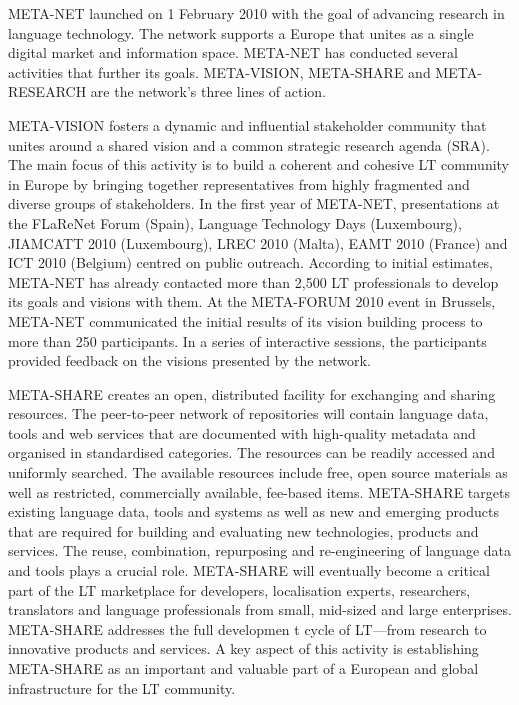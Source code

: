 \begin{multicols}{2}
META-NET launched on 1 February 2010 with the goal of advancing research in language technology. The network supports a Europe that unites as a single digital market and information space. META-NET has conducted several activities that further its goals. META-VISION, META-SHARE and META-RESEARCH are the network’s three lines of action.

META-VISION fosters a dynamic and influential stakeholder community that unites around a shared vision and a common strategic research agenda (SRA). The main focus of this activity is to build a coherent and cohesive LT community in Europe by bringing together representatives from highly fragmented and diverse groups of stakeholders. In the first year of META-NET, presentations at the FLaReNet Forum (Spain), Language Technology Days (Luxembourg), JIAMCATT 2010 (Luxembourg), LREC 2010 (Malta), EAMT 2010 (France) and ICT 2010 (Belgium) centred on public outreach. According to initial estimates, META-NET has already contacted more than 2,500 LT professionals to develop its goals and visions with them. At the META-FORUM 2010 event in Brussels, META-NET communicated the initial results of its vision building process to more than 250 participants. In a series of interactive sessions, the participants provided feedback on the visions presented by the network. 

META-SHARE creates an open, distributed facility for exchanging and sharing resources. The peer-to-peer network of repositories will contain language data, tools and web services that are documented with high-quality metadata and organised in standardised categories. The resources can be readily accessed and uniformly searched. The available resources include free, open source materials as well as restricted, commercially available, fee-based items. META-SHARE targets existing language data, tools and systems as well as new and emerging products that are required for building and evaluating new technologies, products and services. The reuse, combination, repurposing and re-engineering of language data and tools plays a crucial role. META-SHARE will eventually become a critical part of the LT marketplace for developers, localisation experts, researchers, translators and language professionals from small, mid-sized and large enterprises. META-SHARE addresses the full developmen
 t cycle of LT—from research to innovative products and services. A key aspect of this activity is establishing META-SHARE as an important and valuable part of a European and global infrastructure for the LT community. 


\end{multicols}
